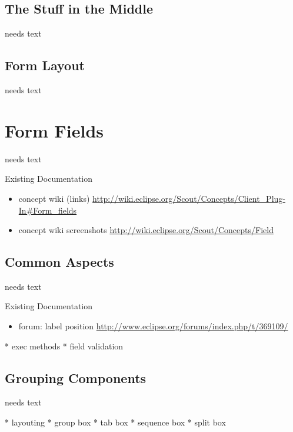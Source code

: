 \documentclass[a4paper,10pt,twoside]{book}
\begin{document}
\section{The Stuff in the Middle}
needs text

\section{Form Layout}
needs text

\chapter{Form Fields}

needs text

\noindent Existing Documentation
\begin{itemize}
  \item concept wiki (links) \url{http://wiki.eclipse.org/Scout/Concepts/Client_Plug-In#Form_fields}
  \item concept wiki screenshots \url{http://wiki.eclipse.org/Scout/Concepts/Field}
\end{itemize}

\section{Common Aspects}
needs text

\noindent Existing Documentation
\begin{itemize}
  \item forum: label position \url{http://www.eclipse.org/forums/index.php/t/369109/}
\end{itemize}

* exec methods
* field validation

	
\section{Grouping Components}
needs text

* layouting
* group box
* tab box
* sequence box 
* split box

\end{document}
